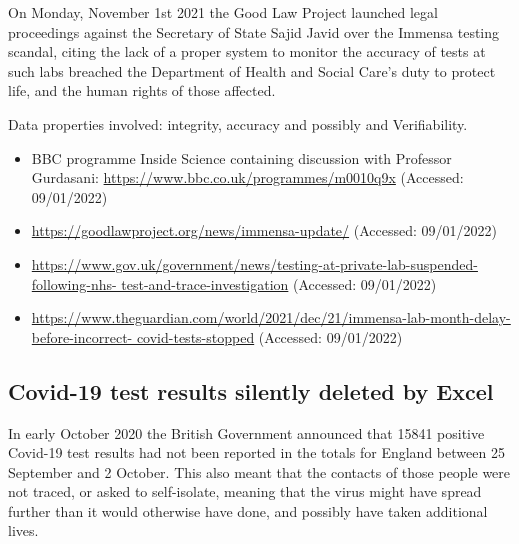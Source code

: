 On Monday, November 1st 2021 the Good Law Project launched legal proceedings against the Secretary of State Sajid Javid over the Immensa testing scandal,
citing the lack of a proper system to monitor the \gls{accuracy} of tests at such labs breached the Department of Health and Social Care's duty to protect life, and the human rights of those affected.

Data properties involved: \gls{integrity}, \gls{accuracy} and possibly  and Verifiability.

\begin{itemize}
  \item BBC programme Inside Science containing discussion with Professor Gurdasani: \href{https://www.bbc.co.uk/programmes/m0010q9x}{https://www.bbc.co.uk/programmes/m0010q9x} (Accessed: 09/01/2022)
  \item\href{https://goodlawproject.org/news/immensa-update/}{https://goodlawproject.org/news/immensa-update/} (Accessed: 09/01/2022)
  \item\href{https://www.gov.uk/government/news/testing-at-private-lab-suspended-following-nhs-test-and-trace-investigation}{https://www.gov.uk/government/news/testing-at-private-lab-suspended-following-nhs- test-and-trace-investigation} (Accessed: 09/01/2022)
  \item\href{https://www.theguardian.com/world/2021/dec/21/immensa-lab-month-delay-before-incorrect-covid-tests-stopped}{https://www.theguardian.com/world/2021/dec/21/immensa-lab-month-delay-before-incorrect- covid-tests-stopped} (Accessed: 09/01/2022)
\end{itemize}

\subsection{Covid-19 test results silently deleted by Excel} \label{bkm:incacc:covidexcel}

In early October 2020 the British Government announced that 15841 positive Covid-19 test results had not been reported in the totals for England between 25 September and 2 October. This also meant that the contacts of those people were not traced, or asked to self-isolate, meaning that the virus might have spread further than it would otherwise have done, and possibly have taken additional lives.

